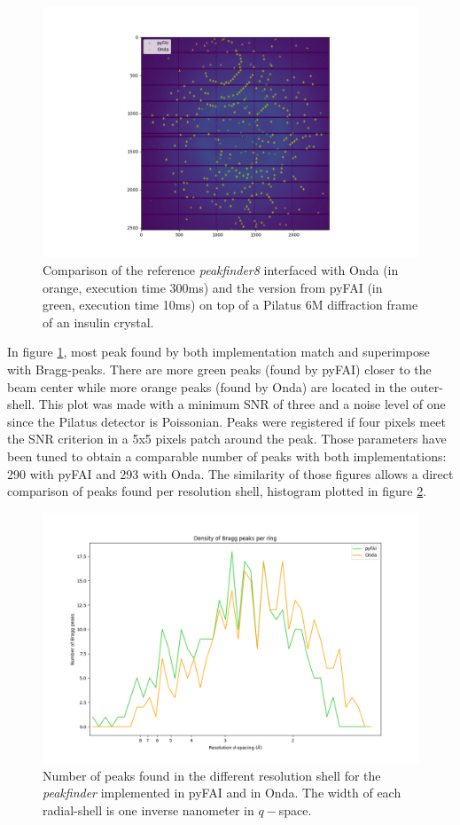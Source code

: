 \documentclass[preprint]{iucr}              %
\begin{document}
\begin{figure}
\label{peakfinder}
\includegraphics[width=12cm]{peakfinder}
\caption{Comparison of the reference \textit{peakfinder8} interfaced with Onda (in orange, execution time 300ms) and the version from pyFAI (in green, execution time 10ms) on top of a Pilatus 6M diffraction frame of an insulin crystal.}
\end{figure}

In figure \ref{peakfinder}, most peak found by both implementation match and superimpose with Bragg-peaks.
There are more green peaks (found by pyFAI) closer to the beam center while more orange peaks (found by Onda) are located in the outer-shell.
This plot was made with a minimum SNR of three and a noise level of one since the Pilatus detector is Poissonian.
Peaks were registered if four pixels meet the SNR criterion in a 5x5 pixels patch around the peak.
Those parameters have been tuned to obtain a comparable number of peaks with both implementations: 290 with pyFAI and 293 with Onda.
The similarity of those figures allows a direct comparison of peaks found per resolution shell, histogram plotted in figure \ref{peak_per_ring}.

\begin{figure}
\label{peak_per_ring}
\includegraphics[width=12cm]{peak_per_ring}
\caption{Number of peaks found in the different resolution shell for the \textit{peakfinder} implemented in pyFAI and in Onda. The width of each radial-shell is one inverse nanometer in $q-$space.}
\end{figure}
\end{document}
